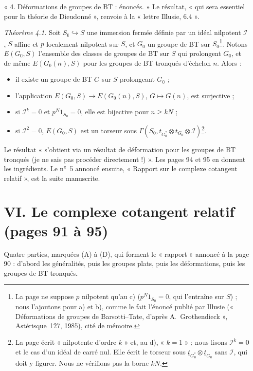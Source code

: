 \documentclass[11pt,a4paper]{article}
\begin{document}
« 4. Déformations de groupes de BT : énoncés. » Le résultat, « qui sera
essentiel pour la théorie de Dieudonné », renvoie à la « lettre Illusie,
6.4 ».

\emph{Théorème 4.1.} Soit $S_0 \hookrightarrow S$ une immersion fermée
définie par un idéal nilpotent $\mathcal{I}$, $S$ affine et $p$
localement nilpotent sur $S$, et $G_0$ un groupe de BT sur
$S_0$\footnote{La page ne suppose $p$ nilpotent qu'au c) ($p^{N} 1_{S_0}
= 0$, qui l'entraîne sur $S$) ; nous l'ajoutons pour a) et b), comme le
fait l'énoncé publié par Illusie (« Déformations de groupes de
Barsotti–Tate, d'après A.~Grothendieck », Astérisque~127, 1985), cité de
mémoire.}. Notons $E(G_0, S)$ l'ensemble des classes de groupes de BT sur
$S$ qui prolongent $G_0$, et de même $E(G_0(n), S)$ pour les groupes de BT
tronqués d'échelon $n$. Alors :
\begin{itemize}
  \item[a)] il existe un groupe de BT $G$ sur $S$ prolongeant $G_0$ ;
  \item[b)] l'application $E(G_0, S) \to E(G_0(n), S)$, $G \mapsto G(n)$,
  est surjective ;
  \item[c)] si $\mathcal{I}^{k} = 0$ et $p^{N} 1_{S_0} = 0$, elle est
  bijective pour $n \geq kN$ ;
  \item[d)] si $\mathcal{I}^{2} = 0$, $E(G_0, S)$ est un torseur sous
  $\Gamma(S_0, t_{G_0^{*}} \otimes t_{G_0} \otimes \mathcal{I})$\footnote{La
  page écrit « nilpotente d'ordre $k$ » et, au d), « $k = 1$ » ; nous
  lisons $\mathcal{I}^{k} = 0$ et le cas d'un idéal de carré nul. Elle
  écrit le torseur sous $\underline{t}_{G_0^{*}} \otimes
  \underline{t}_{G_0}$ sans $\mathcal{I}$, qui doit y figurer. Nous ne
  vérifions pas la borne $kN$.}.
\end{itemize}
Le résultat « s'obtient via un résultat de déformation pour les groupes de
BT tronqués (je ne sais pas procéder directement !) ». Les pages 94 et 95
en donnent les ingrédients. Le n°~5 annoncé ensuite, « Rapport sur le
complexe cotangent relatif », est la suite manuscrite.

\section*{VI. Le complexe cotangent relatif (pages 91 à 95)}

Quatre parties, marquées (A) à (D), qui forment le « rapport » annoncé à la
page 90 : d'abord les généralités, puis les groupes plats, puis les
déformations, puis les groupes de BT tronqués.
\end{document}
